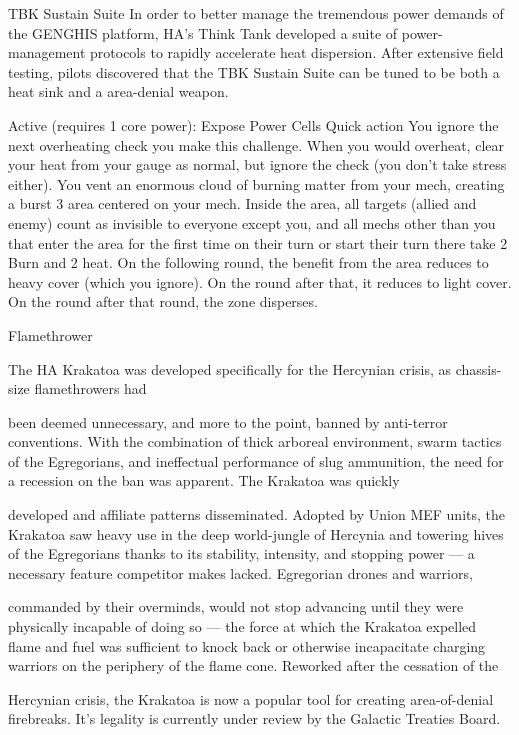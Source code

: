                                             TBK Sustain Suite
In order to better manage the tremendous power demands of the GENGHIS platform, HA’s Think Tank
developed a suite of power-management protocols to rapidly accelerate heat dispersion. After extensive
field testing, pilots discovered that the TBK Sustain Suite can be tuned to be both a heat sink and a
area-denial weapon.

Active (requires 1 core power): Expose Power Cells
Quick action
You ignore the next overheating check you make this challenge. When you would overheat, clear your
heat from your gauge as normal, but ignore the check (you don’t take stress either). You vent an
enormous cloud of burning matter from your mech, creating a burst 3 area centered on your mech.
Inside the area, all targets (allied and enemy) count as invisible to everyone except you, and all mechs
other than you that enter the area for the first time on their turn or start their turn there take 2 Burn and
2 heat.
On the following round, the benefit from the area reduces to heavy cover (which you ignore). On the
round after that, it reduces to light cover. On the round after that round, the zone disperses.




Flamethrower

The HA Krakatoa was developed specifically for the Hercynian crisis, as chassis-size flamethrowers had

been deemed unnecessary, and more to the point, banned by anti-terror conventions. With the
combination of thick arboreal environment, swarm tactics of the Egregorians, and ineffectual performance
of slug ammunition, the need for a recession on the ban was apparent. The Krakatoa was quickly

developed and affiliate patterns disseminated. Adopted by Union MEF units, the Krakatoa saw heavy use in
the deep world-jungle of Hercynia and towering hives of the Egregorians thanks to its stability, intensity,
and stopping power — a necessary feature competitor makes lacked. Egregorian drones and warriors,

commanded by their overminds, would not stop advancing until they were physically incapable of doing so
— the force at which the Krakatoa expelled flame and fuel was sufficient to knock back or otherwise
incapacitate charging warriors on the periphery of the flame cone. Reworked after the cessation of the

Hercynian crisis, the Krakatoa is now a popular tool for creating area-of-denial firebreaks. It’s legality is
currently under review by the Galactic Treaties Board.

